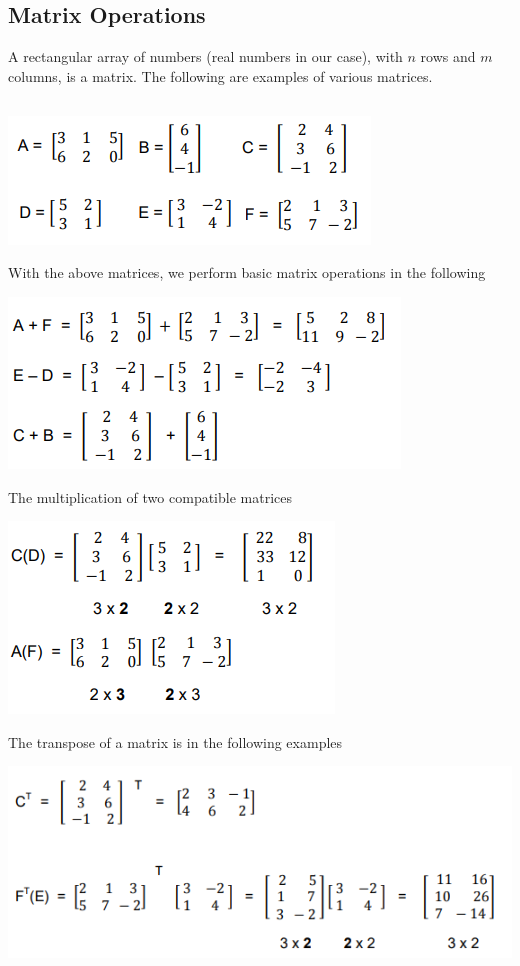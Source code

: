 \documentclass[
]{book}
\begin{document}
\hypertarget{matrix-operations}{%
\subsection{Matrix Operations}\label{matrix-operations}}

A rectangular array of numbers (real numbers in our case), with \(n\) rows and \(m\) columns, is a matrix. The following are examples of various matrices.

\hypertarget{section}{%
\subsection{}\label{section}}

\begin{center}\includegraphics[width=0.4\linewidth]{topic11/exampleMatrices} \end{center}

With the above matrices, we perform basic matrix operations in the following

\begin{center}\includegraphics[width=0.4\linewidth]{topic11/fourOperations} \end{center}

The multiplication of two compatible matrices

\begin{center}\includegraphics[width=0.3\linewidth]{topic11/multiplicativeOperation} \end{center}

The transpose of a matrix is in the following examples

\begin{center}\includegraphics[width=0.6\linewidth]{topic11/transposeOperation} \end{center}
\end{document}
